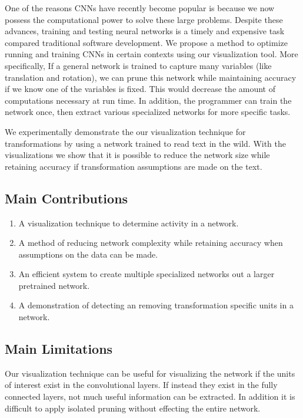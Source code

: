 \documentclass[10pt,twocolumn,letterpaper]{article}
\begin{document}
One of the reasons CNNs have recently become popular is because we now possess the computational power to solve these large problems. Despite these advances, training and testing neural networks is a timely and expensive task compared traditional software development. We propose a method to optimize running and training CNNs in certain contexts using our visualization tool. More specifically, If a general network is trained to capture many variables (like translation and rotation), we can prune this network while maintaining accuracy if we know one of the variables is fixed. This would decrease the amount of computations necessary  at run time. In addition, the programmer can train the network once, then extract various specialized networks for more specific tasks.

We experimentally demonstrate the our visualization technique for transformations by using a network trained to read text in the wild. With the visualizations we show that it is possible to reduce the network size while retaining accuracy if transformation assumptions are made on the text.

\subsection{Main Contributions}

\begin{enumerate}
\item A visualization technique to determine activity in a network.

\item A method of reducing network complexity while retaining accuracy when assumptions on the data can be made.

\item An efficient system to create multiple specialized networks out a larger pretrained network.

\item A demonstration of detecting an removing transformation specific units in a network.
\end{enumerate}

\subsection{Main Limitations}
Our visualization technique can be useful for visualizing the network if the units of interest exist in the convolutional layers. If instead they exist in the fully connected layers, not much useful information can be extracted. In addition it is difficult to apply isolated pruning without effecting the entire network.
\end{document}
